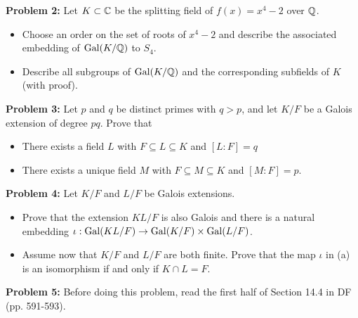 \documentclass[11pt]{amsart}
\begin{document}
{\bf Problem 2:} Let $K\subset{\mathbb C}$ be the splitting field of $f(x)=x^4-2$ over ${\mathbb Q}$.

\begin{itemize}
\item[(a)] Choose an order on the set of roots of $x^4-2$ and describe the associated embedding
of ${\rm Gal}(K/{\mathbb Q})$ to $S_4$.

\item[(b)] Describe all subgroups of ${\rm Gal}(K/{\mathbb Q})$ and the corresponding subfields of $K$ (with proof).

\end{itemize}

\skv
{\bf Problem 3:} Let $p$ and $q$ be distinct primes with $q>p$,
and let $K/F$ be a Galois extension of degree $pq$. Prove that
\begin{itemize}
\item[(a)] There exists a field $L$ with $F\subseteq L\subseteq K$ and $[L:F]=q$

\item[(b)] There exists a unique field $M$ with $F\subseteq M\subseteq K$ and $[M:F]=p$.
\end{itemize}
\skv

\skv
{\bf Problem 4:} Let $K/F$ and $L/F$ be Galois extensions.

\begin{itemize}
\item[(a)] Prove that the extension $KL/F$ is also Galois and there is a natural
embedding $\iota:{\rm Gal}(KL/F)\to {\rm Gal}(K/F)\times {\rm Gal}(L/F)$.

\item[(b)]
Assume now that $K/F$ and $L/F$ are both finite. Prove that the map $\iota$ in (a)
is an isomorphism if and only if $K\cap L=F$.
\end{itemize}

{\bf Problem 5:} \rm Before doing this problem, read the first half
of Section 14.4 in DF (pp. 591-593).
\end{document}
